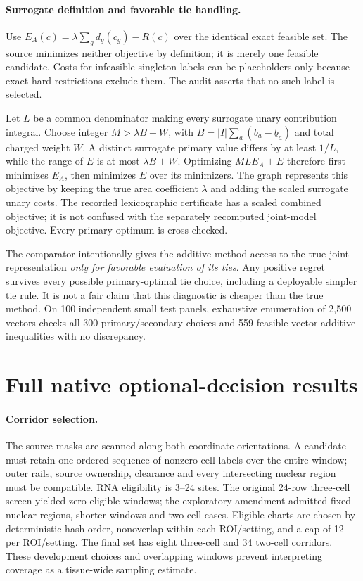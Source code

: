 \documentclass[10pt,letterpaper]{article}
\begin{document}
\paragraph{Surrogate definition and favorable tie handling.}
Use $E_A(c)=\lambda\sum_gd_g(c_g)-R(c)$ over the identical exact feasible set. The source minimizes neither objective by definition; it is merely one feasible candidate. Costs for infeasible singleton labels can be placeholders only because exact hard restrictions exclude them. The audit asserts that no such label is selected.

Let $L$ be a common denominator making every surrogate unary contribution integral. Choose integer $M>\lambda B+W$, with $B=|I|\sum_a(\overline b_a-\underline b_a)$ and total charged weight $W$. A distinct surrogate primary value differs by at least $1/L$, while the range of $E$ is at most $\lambda B+W$. Optimizing $ML E_A+E$ therefore first minimizes $E_A$, then minimizes $E$ over its minimizers. The graph represents this objective by keeping the true area coefficient $\lambda$ and adding the scaled surrogate unary costs. The recorded lexicographic certificate has a scaled combined objective; it is not confused with the separately recomputed joint-model objective. Every primary optimum is cross-checked.

The comparator intentionally gives the additive method access to the true joint representation \emph{only for favorable evaluation of its ties}. Any positive regret survives every possible primary-optimal tie choice, including a deployable simpler tie rule. It is not a fair claim that this diagnostic is cheaper than the true method. On 100 independent small test panels, exhaustive enumeration of 2,500 vectors checks all 300 primary/secondary choices and 559 feasible-vector additive inequalities with no discrepancy.

\section{Full native optional-decision results}
\paragraph{Corridor selection.}
The source masks are scanned along both coordinate orientations. A candidate must retain one ordered sequence of nonzero cell labels over the entire window; outer rails, source ownership, clearance and every intersecting nuclear region must be compatible. RNA eligibility is 3--24 sites. The original 24-row three-cell screen yielded zero eligible windows; the exploratory amendment admitted fixed nuclear regions, shorter windows and two-cell cases. Eligible charts are chosen by deterministic hash order, nonoverlap within each ROI/setting, and a cap of 12 per ROI/setting. The final set has eight three-cell and 34 two-cell corridors. These development choices and overlapping windows prevent interpreting coverage as a tissue-wide sampling estimate.
\end{document}
